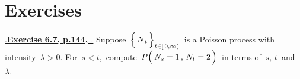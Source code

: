 

\section{Exercises}
\setcounter{theorem}{0}
\setcounter{equation}{0}


\renewcommand{\theenumi}{\roman{enumi}}
\renewcommand{\labelenumi}{\textnormal{(\theenumi)}$\;\;$}


\noindent
\underline{{\color{white}.}\textbf{Exercise 6.7, p.144, \cite{Brzezniak1999}}{\color{white}.}}
\vskip 0.3cm
\noindent
Suppose \,$\left\{\,\overset{{\color{white}.}}{N}_{t}\,\right\}_{t\in[\,0,\infty)}$\, is a Poisson process
with intensity \,$\lambda > 0$.
\vskip 0.2cm
\noindent
For \,$s < t$,\, compute \,$P\!\left(\,N_{s} \overset{{\color{white}-}}{=} 1\,,\,N_{t} = 2\,\right)$\, in terms of \,$s,\,t$\, and \,$\lambda$.

